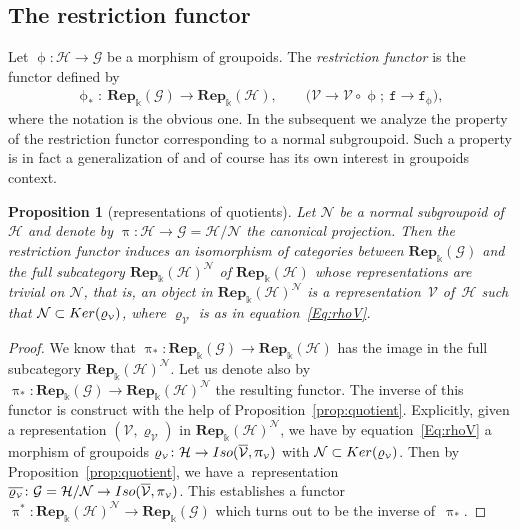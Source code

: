 \documentclass[11pt]{article}
\numberwithin{equation}{section}
\newtheorem{Proposition}[Theorem]{Proposition}
 { \theoremstyle{definition}
\newtheorem{Definition}[Theorem]{Definition}
\newtheorem{Remark}[Theorem]{Remark}
\newtheorem{Example}[Theorem]{Example}
 }
\newcommand{\bara}[1]{\overline{#1}}
\newcommand{\Rep}[1]{\mathbf{Rep}_{\Sscript{\Bbbk}}(#1)}
\newcommand{\tF}{\texttt{f}}
\newcommand{\phil}{\upphi_{\Sscript{*}}}
\newcommand{\Ker}[1]{{\rm Ker}(#1)}
\newcommand{\cG}{{\mathcal G}}
\newcommand{\cH}{{\mathcal H}}
\newcommand{\cN}{{\mathcal N}}
\newcommand{\cV}{{\mathcal V}}
\newcommand{\Sscript}[1]{\scriptscriptstyle{#1}}
\begin{document}
\subsection{The restriction functor}\label{ssec:Res}
Let $\upphi\colon \cH \to \cG$ be a morphism of groupoids. The \emph{restriction functor} is the functor defined by
\begin{gather}\label{Eq:restriction}
\phil\colon \ \Rep{\cG} \longrightarrow \Rep{\cH}, \qquad \big( \cV\longrightarrow \cV \circ \upphi;\ \tF \longrightarrow\tF_{\Sscript{\upphi}} \big),
\end{gather}
where the notation is the obvious one. In the subsequent we analyze the property of the restriction functor corresponding to a normal subgroupoid. Such a property is in fact a generalization of \cite[Proposition~2.3.2]{Kowalski:2014} and of course has its own interest in groupoids context.

\begin{Proposition}[representations of quotients]\label{prop:Res} Let $\cN$ be a normal subgroupoid of $\cH$ and denote by $\uppi\colon \cH \to \cG=\cH/\cN$ the canonical projection. Then the restriction functor induces an isomorphism of categories between $\Rep{\cG}$ and the full subcategory $\Rep{\cH}^{\Sscript{\cN}}$ of $\Rep{\cH}$ whose representations are trivial on $\cN$, that is, an object in $\Rep{\cH}^{\Sscript{\cN}}$ is a representation~$\cV$ of~$\cH$ such that $\cN \subset \Ker{\varrho_{\Sscript{\cV}}}$, where $\varrho_{\Sscript{\cV}}$ is as in equation~\eqref{Eq:rhoV}.
\end{Proposition}
\begin{proof}We know that $\uppi_{*}\colon \Rep{\cG} \!\to\! \Rep{\cH}$ has the image in the full subcategory $\Rep{\cH}^{\Sscript{\cN}}\!$. Let us denote also by $\uppi_{*}\colon \Rep{\cG} \to \Rep{\cH}^{\Sscript{\cN}}$ the resulting functor. The inverse of this functor is construct with the help of Proposition~\ref{prop:quotient}. Explicitly, given a representation $(\cV, \varrho_{\Sscript{\cV}})$ in $\Rep{\cH}^{\Sscript{\cN}}$, we have by equation~\eqref{Eq:rhoV} a morphism of groupoids $\varrho_{\Sscript{\cV}}\colon \cH \to {\rm Iso}(\bara{\cV}, \uppi_{\Sscript{\cV}})$ with $\cN \subset \Ker{\varrho_{\Sscript{\cV}}}$. Then by Proposition~\ref{prop:quotient}, we have a~representation $\bara{\varrho_{\Sscript{\cV}}}\colon \cG=\cH/\cN \to {\rm Iso}(\bara{\cV}, \pi_{\Sscript{\cV}})$. This establishes a functor $\uppi^{*}\colon \Rep{\cH}^{\Sscript{\cN}} \to
\Rep{\cG}$ which turns out to be the inverse of~$\uppi_{*}$.
\end{proof}
\end{document}
